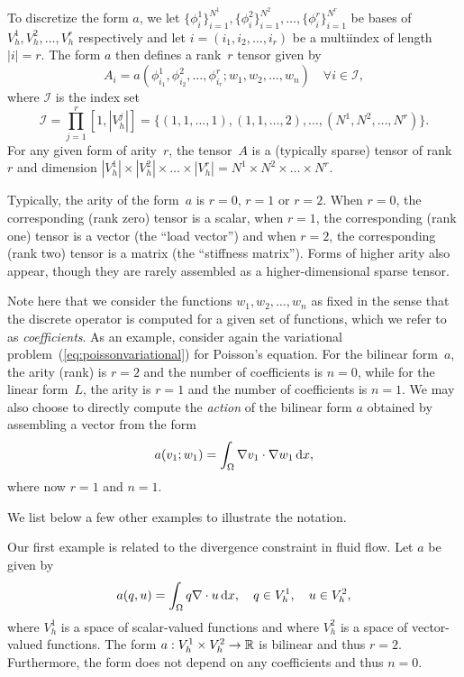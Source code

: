 To discretize the form $a$, we let
$\{\phi_i^1\}_{i=1}^{N^1},
 \{\phi_i^2\}_{i=1}^{N^2}, \ldots,
 \{\phi_i^r\}_{i=1}^{N^r}$
be bases of $V_h^1, V_h^2, \ldots, V_h^r$ respectively and let $i =
(i_1, i_2, \ldots, i_r)$ be a multiindex of length $|i| = r$. The
form $a$ then defines a rank~$r$ tensor given by
\begin{equation} \label{eq:tensor}
  A_i = a(\phi_{i_1}^1, \phi_{i_2}^2, \ldots, \phi_{i_r}^r; w_1, w_2, \ldots, w_n)
  \quad \forall i \in \mathcal{I},
\end{equation}
where $\mathcal{I}$ is the index set
\begin{equation}
  \mathcal{I} = 
  \prod_{j=1}^r[1,|V^j_h|] = \{(1,1,\ldots,1), (1,1,\ldots,2), \ldots,
  (N^1,N^2,\ldots,N^r)\}.
\end{equation}
For any given form of arity~$r$, the tensor~$A$ is a
(typically sparse) tensor of rank~$r$ and dimension
$|V_h^1| \times |V_h^2| \times \ldots \times |V_h^r|
= N^1 \times N^2 \times \ldots \times N^r$.

Typically, the arity of the form~$a$ is $r = 0$, $r = 1$
or $r = 2$. When $r = 0$, the corresponding (rank zero) tensor is a
scalar, when $r = 1$, the corresponding (rank one) tensor is a vector
(the ``load vector'') and when $r = 2$, the corresponding (rank two)
tensor is a matrix (the ``stiffness matrix'').
Forms of higher arity also appear, though they are rarely assembled as
a higher-dimensional sparse tensor.

Note here that we consider the functions $w_1, w_2, \ldots, w_n$ as
fixed in the sense that the discrete operator is computed for a given
set of functions, which we refer to as \emph{coefficients}. As an
example, consider again the variational
problem~(\ref{eq:poissonvariational}) for Poisson's equation. For the
bilinear form~$a$, the arity (rank) is $r = 2$ and the number of
coefficients is $n = 0$, while for the linear form~$L$, the arity is
$r = 1$ and the number of coefficients is $n = 1$. We may also choose
to directly compute the \emph{action} of the bilinear form $a$
obtained by assembling a vector from the form
\begin{equation}
  a(v_1; w_1) = \int_{\Omega} \nabla v_1 \cdot \nabla w_1 \, \mathrm{d}x,
\end{equation}
where now $r = 1$ and $n = 1$.

We list below a few other examples to illustrate the notation.

\begin{example}
\label{example:div}
Our first example is related
to the divergence constraint in fluid flow. Let $a$ be given by
\begin{equation}
a(q, u) = \int_{\Omega} q \nabla \cdot u \, \mathrm{d}x, \quad q\in V_h^1, \quad u\in V_h^2, 
\end{equation}
where $V_h^1$ is a space of scalar-valued functions and
where $V_h^2$ is a space of vector-valued functions.
The form $a : V_h^1 \times V_h^2  \rightarrow \mathbb{R}$ is bilinear and
thus $r = 2$. Furthermore, the form does not depend on any
coefficients and thus $n=0$.   
\end{example}

